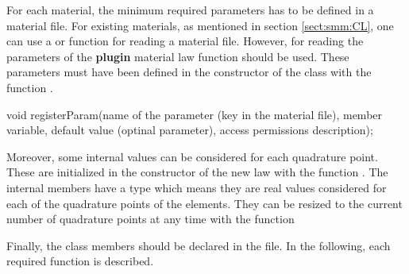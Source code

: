 For each material, the minimum required parameters has to be defined in a
material file.  For existing materials, as mentioned in section
\ref{sect:smm:CL}, one can use a  or 
function for reading a material file. However, for reading the parameters of the
\textbf{plugin} material law  function should be
used. These parameters must have been defined in the constructor of the class with the function .
\begin{cpp}
  void registerParam(name of the parameter (key in the material file),
                     member variable,
                     default value (optinal parameter),
                     access permissions
                     description);
\end{cpp}

Moreover, some internal values can be considered for each quadrature point.
These are initialized in the constructor of the new law with the
function . The
internal members have a  type which means they are real
values considered for each of the quadrature points of the
elements. They can be resized to the current number of quadrature points at any
time with the function

Finally, the class members should be declared in the 
file. In the following, each required function is described.

